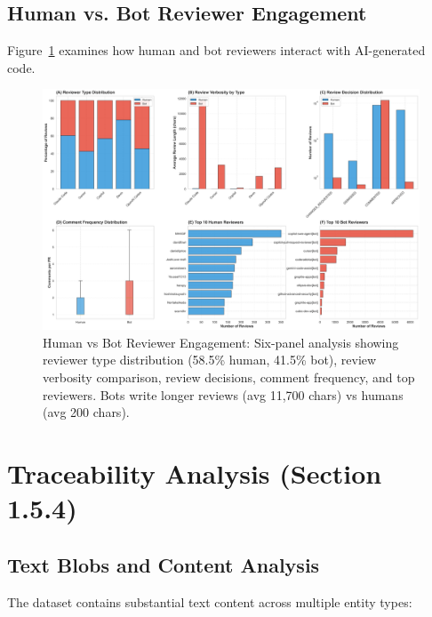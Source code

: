 \documentclass[11pt]{article}
\begin{document}
\subsection{Human vs. Bot Reviewer Engagement}

Figure~\ref{fig:human_bot} examines how human and bot reviewers interact with AI-generated code.

\begin{figure}[H]
\centering
\includegraphics[width=\textwidth]{figures/fig5_human_vs_bot_engagement.png}
\caption{Human vs Bot Reviewer Engagement: Six-panel analysis showing reviewer type distribution (58.5\% human, 41.5\% bot), review verbosity comparison, review decisions, comment frequency, and top reviewers. Bots write longer reviews (avg 11,700 chars) vs humans (avg 200 chars).}
\label{fig:human_bot}
\end{figure}

\section{Traceability Analysis (Section 1.5.4)}

\subsection{Text Blobs and Content Analysis}

The dataset contains substantial text content across multiple entity types:
\end{document}
